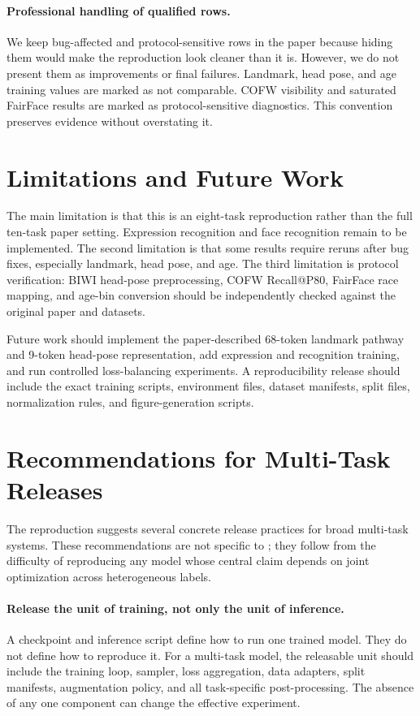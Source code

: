 \paragraph{Professional handling of qualified rows.}
We keep bug-affected and protocol-sensitive rows in the paper because hiding them would make the reproduction look cleaner than it is. However, we do not present them as improvements or final failures. Landmark, head pose, and age training values are marked as not comparable. COFW visibility and saturated FairFace results are marked as protocol-sensitive diagnostics. This convention preserves evidence without overstating it.

\section{Limitations and Future Work}

The main limitation is that this is an eight-task reproduction rather than the full ten-task paper setting. Expression recognition and face recognition remain to be implemented. The second limitation is that some results require reruns after bug fixes, especially landmark, head pose, and age. The third limitation is protocol verification: BIWI head-pose preprocessing, COFW Recall@P80, FairFace race mapping, and age-bin conversion should be independently checked against the original paper and datasets.

Future work should implement the paper-described 68-token landmark pathway and 9-token head-pose representation, add expression and recognition training, and run controlled loss-balancing experiments. A reproducibility release should include the exact training scripts, environment files, dataset manifests, split files, normalization rules, and figure-generation scripts.

\section{Recommendations for Multi-Task Releases}

The reproduction suggests several concrete release practices for broad multi-task systems. These recommendations are not specific to \method; they follow from the difficulty of reproducing any model whose central claim depends on joint optimization across heterogeneous labels.

\paragraph{Release the unit of training, not only the unit of inference.}
A checkpoint and inference script define how to run one trained model. They do not define how to reproduce it. For a multi-task model, the releasable unit should include the training loop, sampler, loss aggregation, data adapters, split manifests, augmentation policy, and all task-specific post-processing. The absence of any one component can change the effective experiment.

